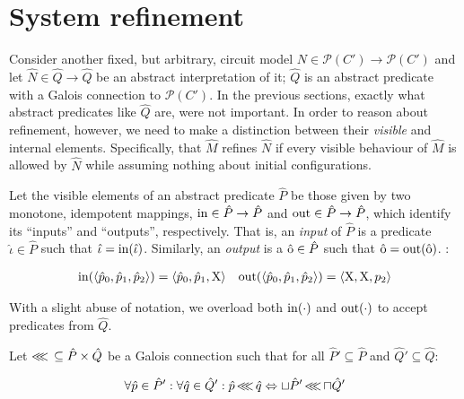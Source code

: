 \section{System refinement}

Consider another fixed, but arbitrary, circuit model $N \in \mathcal{P}(C') \rightarrow \mathcal{P}(C')$ and let $\hat N \in \hat Q \rightarrow \hat Q$ be an abstract interpretation of it; $\hat Q$ is an abstract predicate with a Galois connection to $\mathcal{P}(C')$. In the previous sections, exactly what abstract predicates like $\hat Q$ are, were not important. In order to reason about refinement, however, we need to make a distinction between their \textit{visible} and internal elements. Specifically,  that $\hat M$ refines $\hat N$ if every visible behaviour of $\hat M$ is allowed by $\hat N$ while assuming nothing about initial configurations.

Let the visible elements of an abstract predicate $\hat P$ be those given by two monotone, idempotent mappings, $\operatorname{in} \in \hat P \rightarrow \hat P$ and $\operatorname{out} \in \hat P \rightarrow \hat P$, which identify its ``inputs'' and ``outputs'', respectively. That is, an \textit{input} of $\hat P$ is a predicate $\hat \iota \in \hat P$ such that $\hat \iota = \operatorname{in}(\hat \iota)$. Similarly, an \textit{output} is a $\hat {\mathrm{o}} \in \hat P$ such that $\hat {\mathrm{o}} = \operatorname{out}(\hat {\mathrm{o}})$. :

\begin{align*}
\operatorname{in}(\langle \hat p_{0}, \hat p_{1}, \hat p_{2} \rangle) = \langle \hat p_{0}, \hat p_{1}, \mathrm{X} \rangle &&
\operatorname{out}(\langle \hat p_{0}, \hat p_{1}, \hat p_{2} \rangle) = \langle \mathrm{X}, \mathrm{X}, p_{2} \rangle
\end{align*}


\noindent With a slight abuse of notation, we overload both $\operatorname{in}(\cdot)$ and $\operatorname{out}(\cdot)$ to accept predicates from $\hat Q$.

Let $\operatorname{\lll} \, \subseteq \hat P \times \hat Q$ be a Galois connection such that for all $\hat P' \subseteq \hat P$ and $\hat Q' \subseteq \hat Q$:

\begin{equation*}
\forall \hat p \in \hat P' : \forall \hat q \in \hat Q' : \hat p \operatorname{\lll} \hat q \Leftrightarrow \sqcup \hat P' \operatorname{\lll} \sqcap \hat Q'
\end{equation*}

